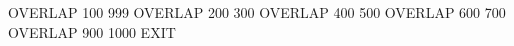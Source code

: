 OVERLAP  100   999
OVERLAP  200   300
OVERLAP  400   500
OVERLAP  600   700
OVERLAP  900  1000
EXIT

